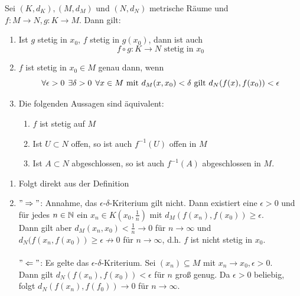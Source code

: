 \begin{prop} \label{prop:1-4.13}
	Sei $(K,d_{K}), (M, d_{M})$ und $(N, d_{N})$ metrische Räume und $f: M \rightarrow N, g: K \rightarrow M$. Dann gilt:
	\begin{enumerate}[label=\alph*\upshape)]
		\item Ist $g$ stetig in $x_{0}$, $f$ stetig in $g(x_{0})$, dann ist auch 
			\[ f \circ g: K \rightarrow N \text{ stetig in } x_{0} \]
		\item \label{prop:1-4.13.b} $f$ ist stetig in $x_{0} \in M$ genau dann, wenn 
			\[ \forall \epsilon > 0 \hspace{0.15cm} \exists \delta > 0 \hspace{0.15cm} \forall x \in M \text{ mit } d_{M}(x, x_{0}) < \delta \text{ gilt } d_{N}(f(x), f(x_{0})) < \epsilon \]
		\item Die folgenden Aussagen sind äquivalent:
			\begin{enumerate}
				\item $f$ ist stetig auf $M$
				\item Ist $U \subset N$ offen, so ist auch $f^{-1}(U)$ offen in $M$
				\item Ist $A \subset N$ abgeschlossen, so ist auch $f^{-1}(A)$ abgeschlossen in $M$.
			\end{enumerate}
	\end{enumerate}	
	\begin{beweis}		
		\begin{enumerate}[label=\alph*\upshape)]	
			\item Folgt direkt aus der Definition
			\item $" \Rightarrow "$: Annahme, das $\epsilon$-$\delta$-Kriterium gilt nicht. Dann existiert eine $\epsilon > 0$ und für jedes $n \in \mathbb{N}$ ein $x_{n} \in K(x_{0}, \frac{1}{n})$ mit $d_{M}(f(x_{n}), f(x_{0})) \geq \epsilon$. \\
				Dann gilt aber $d_{M}(x_{n}, x_{0}) < \frac{1}{n} \rightarrow 0$ für $n \rightarrow \infty$ und $d_{N}(f(x_{n}, f(x_{0})) \geq \epsilon \not\rightarrow 0$ für $n \rightarrow \infty$, d.h. $f$ ist nicht stetig in $x_{0}$. \\ \\
				$" \Leftarrow "$: Es gelte das $\epsilon$-$\delta$-Kriterium. Sei $(x_{n}) \subseteq M$ mit $x_{n} \rightarrow x_{0}, \epsilon > 0$. \\
				Dann gilt $d_{N}(f(x_{n}), f(x_{0})) < \epsilon$ für $n$ gro{\ss} genug. Da $\epsilon > 0$ beliebig, folgt $d_{N}(f(x_{n}), f(f_{0})) \rightarrow 0$ für $n \rightarrow \infty$.

\end{enumerate}
\end{beweis}
\end{prop}
